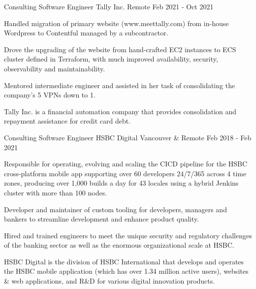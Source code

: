 

\begin{cventries}

  \cventrywithsummary
    {Consulting Software Engineer} %
    {Tally Inc.} %
    {Remote} %
    {Feb 2021 - Oct 2021} %
    {
      \begin{cvitems} %
        \item {Handled migration of primary website (www.meettally.com) from in-house Wordpress to Contentful managed by a subcontractor.}
        \item {Drove the upgrading of the website from hand-crafted EC2 instances to ECS cluster defined in Terraform, with much improved availability, security, observability and maintainability.}
        \item {Mentored intermediate engineer and assisted in her task of consolidating the company's 5 VPNs down to 1.}
      \end{cvitems}
    }
    {
      Tally Inc. is a financial automation company that provides consolidation and repayment assistance for credit card debt.
    }

  \cventrywithsummary
    {Consulting Software Engineer} %
    {HSBC Digital} %
    {Vancouver \& Remote} %
    {Feb 2018 - Feb 2021} %
    {
      \begin{cvitems} %
        \item {Responsible for operating, evolving and scaling the CICD pipeline for the HSBC cross-platform mobile app supporting over 60 developers 24/7/365 across 4 time zones, producing over 1,000 builds a day for 43 locales using a hybrid Jenkins cluster with more than 100 nodes.}
        \item {Developer and maintainer of custom tooling for developers, managers and bankers to streamline development and enhance product quality.}
        \item {Hired and trained engineers to meet the unique security and regulatory challenges of the banking sector as well as the enormous organizational scale at HSBC. }
      \end{cvitems}
    }
    {
      HSBC Digital is the division of HSBC International that develops and operates the HSBC mobile application (which has over 1.34 million active users), websites \& web applications, and R\&D for various digital innovation products.
    }


\end{cventries}
